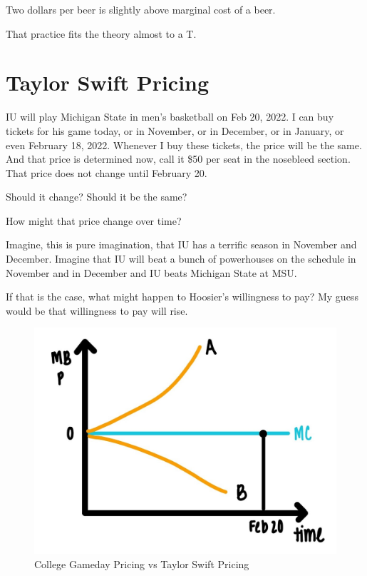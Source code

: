 \documentclass[
]{book}
\begin{document}
Two dollars per beer is slightly above marginal cost of a beer.

That practice fits the theory almost to a T.

\hypertarget{taylor-swift-pricing}{%
\section{Taylor Swift Pricing}\label{taylor-swift-pricing}}

IU will play Michigan State in men's basketball on Feb 20, 2022. I can buy tickets for his game today, or in November, or in December, or in January, or even February 18, 2022. Whenever I buy these tickets, the price will be the same. And that price is determined now, call it \$50 per seat in the nosebleed section.
That price does not change until February 20.

Should it change? Should it be the same?

How might that price change over time?

Imagine, this is pure imagination, that IU has a terrific season in November and December. Imagine that IU will beat a bunch of powerhouses on the schedule in November and in December and IU beats Michigan State at MSU.

If that is the case, what might happen to Hoosier's willingness to pay? My guess would be that willingness to pay will rise.

\begin{figure}

{\centering \includegraphics[width=0.75\linewidth]{img/ch6/fig11} 

}

\caption{College Gameday Pricing vs Taylor Swift Pricing}\label{fig:fig611}
\end{figure}
\end{document}
